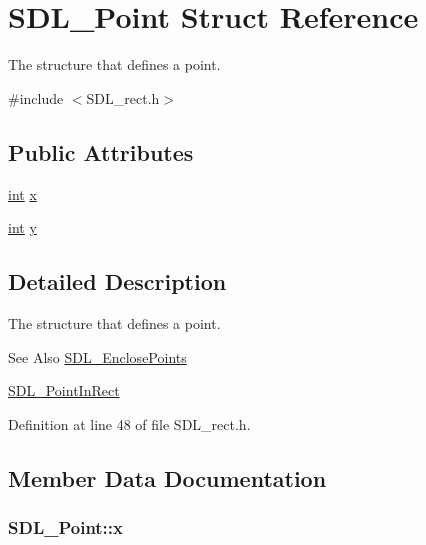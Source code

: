 \hypertarget{struct_s_d_l___point}{\section{S\-D\-L\-\_\-\-Point Struct Reference}
\label{struct_s_d_l___point}
}


The structure that defines a point.  




{\ttfamily \#include $<$S\-D\-L\-\_\-rect.\-h$>$}

\subsection*{Public Attributes}
\begin{DoxyCompactItemize}
\item 
\hyperlink{_s_d_l__thread_8h_a6a64f9be4433e4de6e2f2f548cf3c08e}{int} \hyperlink{struct_s_d_l___point_a2ee987d59888024771c8d83aec43056c}{x}
\item 
\hyperlink{_s_d_l__thread_8h_a6a64f9be4433e4de6e2f2f548cf3c08e}{int} \hyperlink{struct_s_d_l___point_aaa68aefa869f6bdf46367a70bd9414b0}{y}
\end{DoxyCompactItemize}


\subsection{Detailed Description}
The structure that defines a point. 

\begin{DoxySeeAlso}{See Also}
\hyperlink{_s_d_l__rect_8h_afcbb58dbba760b9e6fdb4b5d1ece015c}{S\-D\-L\-\_\-\-Enclose\-Points} 

\hyperlink{_s_d_l__rect_8h_a2f9708f2739ef234c34e6feda50b4d2c}{S\-D\-L\-\_\-\-Point\-In\-Rect} 
\end{DoxySeeAlso}


Definition at line 48 of file S\-D\-L\-\_\-rect.\-h.



\subsection{Member Data Documentation}
\hypertarget{struct_s_d_l___point_a2ee987d59888024771c8d83aec43056c}{
\subsubsection[{x}]{ S\-D\-L\-\_\-\-Point\-::x}}\label{struct_s_d_l___point_a2ee987d59888024771c8d83aec43056c}


